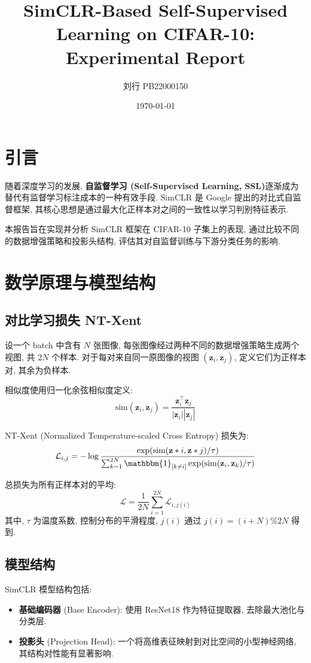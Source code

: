 \documentclass[11pt]{article}
\title{SimCLR-Based Self-Supervised Learning on CIFAR-10: Experimental Report}
\author{刘行 PB22000150}
\date{\today}
\begin{document}
\maketitle

\section{\textbf{引言}}
随着深度学习的发展, \textbf{自监督学习 (Self-Supervised Learning, SSL)}逐渐成为替代有监督学习标注成本的一种有效手段. SimCLR 是 Google 提出的对比式自监督框架, 其核心思想是通过最大化正样本对之间的一致性以学习判别特征表示.

本报告旨在实现并分析 SimCLR 框架在 CIFAR-10 子集上的表现, 通过比较不同的数据增强策略和投影头结构, 评估其对自监督训练与下游分类任务的影响.

\section{\textbf{数学原理与模型结构}}

\subsection{\textbf{对比学习损失 NT-Xent}}
设一个 batch 中含有 $N$ 张图像, 每张图像经过两种不同的数据增强策略生成两个视图, 共 $2N$ 个样本. 对于每对来自同一原图像的视图 $(\mathbf{z}_i, \mathbf{z}_j)$, 定义它们为正样本对, 其余为负样本.

相似度使用归一化余弦相似度定义:
\begin{equation}
\text{sim}(\mathbf{z}_i, \mathbf{z}_j) = \frac{\mathbf{z}_i^\top \mathbf{z}_j}{|\mathbf{z}_i||\mathbf{z}_j|}
\end{equation}

NT-Xent (Normalized Temperature-scaled Cross Entropy) 损失为:
\begin{equation*}
\mathcal{L}_{i,j} = -\log \frac{\exp(\text{sim}(\mathbf{z}*i, \mathbf{z}*j)/\tau)}{\sum_{k=1}^{2N} \mathbbm{1}_{[k \ne i]} \exp(\text{sim}(\mathbf{z}_i, \mathbf{z}_k)/\tau)}
\end{equation*}

总损失为所有正样本对的平均:
\begin{equation*}
\mathcal{L} = \frac{1}{2N} \sum_{i=1}^{2N} \mathcal{L}_{i, j(i)}
\end{equation*}
其中, $\tau$ 为温度系数, 控制分布的平滑程度, $j(i)$ 通过 $j(i) = (i + N) \% 2N$ 得到.

\subsection{\textbf{模型结构}}
SimCLR 模型结构包括:
\begin{itemize}
\item \textbf{基础编码器} (Base Encoder): 使用 ResNet18 作为特征提取器, 去除最大池化与分类层.
\item \textbf{投影头} (Projection Head): 一个将高维表征映射到对比空间的小型神经网络, 其结构对性能有显著影响.
\end{itemize}
\end{document}
